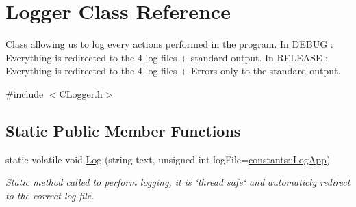 \hypertarget{class_logger}{}\section{Logger Class Reference}
\label{class_logger}


Class allowing us to log every actions performed in the program. In D\+E\+B\+U\+G \+: Everything is redirected to the 4 log files + standard output. In R\+E\+L\+E\+A\+S\+E \+: Everything is redirected to the 4 log files + Errors only to the standard output.  




{\ttfamily \#include $<$C\+Logger.\+h$>$}

\subsection*{Static Public Member Functions}
\begin{DoxyCompactItemize}
\item 
static volatile void \hyperlink{class_logger_aff5ed1580283bcdac191d9ace376b977}{Log} (string text, unsigned int log\+File=\hyperlink{namespaceconstants_afe40c5b2a1c35d5502687c6e68c62872}{constants\+::\+Log\+App})
\begin{DoxyCompactList}\small\item\em Static method called to perform logging, it is \char`\"{}thread safe\char`\"{} and automaticly redirect to the correct log file. \end{DoxyCompactList}\end{DoxyCompactItemize}
